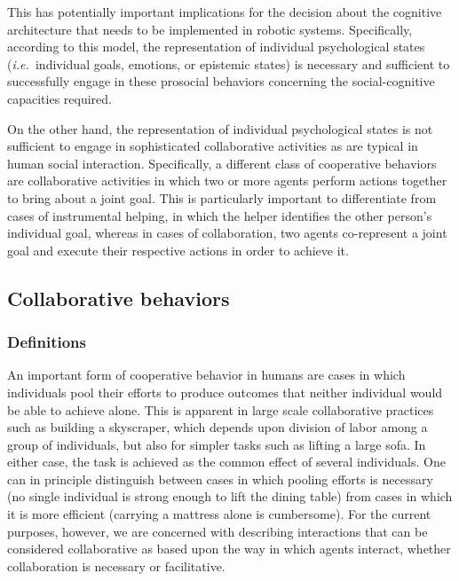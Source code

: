 \documentclass{article}
\newcommand{\ie}{{\textit{i.e.~}}}
\begin{document}
This has potentially important implications for the decision about the
cognitive architecture that needs to be implemented in robotic systems.
Specifically, according to this model, the representation of individual
psychological states (\ie individual goals, emotions, or epistemic states) is
necessary and sufficient to successfully engage in these prosocial behaviors
concerning the social-cognitive capacities required. 

On the other hand, the representation of individual psychological states is not
sufficient to engage in sophisticated collaborative activities as are typical
in human social interaction. Specifically, a different class of cooperative
behaviors are collaborative activities in which two or more agents perform
actions together to bring about a joint goal. This is particularly important to
differentiate from cases of instrumental helping, in which the helper
identifies the other person{}'s individual goal, whereas in cases of
collaboration, two agents co-represent a joint goal and execute their
respective actions in order to achieve it. 

\subsection{Collaborative behaviors}

\subsubsection{Definitions}

An important form of cooperative behavior in humans are cases in which
individuals pool their efforts to produce outcomes that neither individual
would be able to achieve alone. This is apparent in large scale collaborative
practices such as building a skyscraper, which depends upon division of labor
among a group of individuals, but also for simpler tasks such as lifting a
large sofa. In either case, the task is achieved as the common effect of
several individuals. One can in principle distinguish between cases in which
pooling efforts is necessary (no single individual is strong enough to lift the
dining table) from cases in which it is more efficient (carrying a mattress
alone is cumbersome). For the current purposes, however, we are concerned with
describing interactions that can be considered collaborative as based upon the
way in which agents interact, whether collaboration is necessary or
facilitative.
\end{document}
